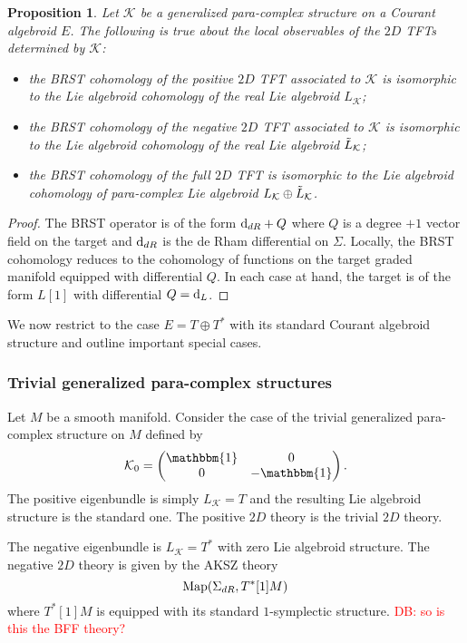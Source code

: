 \documentclass[letterpaper,12pt]{article}
\newcommand{\TT}{{T\oplus T^*}}
\newcommand{\KK}{\mathcal{K}}
\def\d{{\rm d}}
\newcommand{\id}{\mathbbm{1}}
\newtheorem{proposition}[theorem]{Proposition}
\theoremstyle{definition}
\theoremstyle{remark}
\theoremstyle{examples}
\def\david{\textcolor{red}{DB: }\textcolor{red}}
\begin{document}
\begin{proposition}
Let $\KK$ be a generalized para-complex structure on a Courant algebroid $E$.
The following is true about the local observables of the $2D$ TFTs determined by $\KK$:
\begin{itemize}
\item[(1)] the BRST cohomology of the positive $2D$ TFT associated to $\KK$ is isomorphic to the Lie algebroid cohomology of the real Lie algebroid $L_{\KK}$; 
\item[(2)] the BRST cohomology of the negative $2D$ TFT associated to $\KK$ is isomorphic to the Lie algebroid cohomology of the real Lie algebroid $\Tilde{L}_{\KK}$;
\item[(3)] the BRST cohomology of the full $2D$ TFT is isomorphic to the Lie algebroid cohomology of para-complex Lie algebroid $L_{\KK} \oplus \Tilde{L}_{\KK}$.
 \end{itemize}
\end{proposition}

\begin{proof}
The BRST operator is of the form $\d_{dR} + Q$ where $Q$ is a degree $+1$ vector field on the target and $\d_{dR}$ is the de Rham differential on $\Sigma$.  
Locally, the BRST cohomology reduces to the cohomology of functions on the target graded manifold equipped with differential $Q$.
In each case at hand, the target is of the form $L[1]$ with differential $Q = \d_L$.
\end{proof}

We now restrict to the case $E = \TT$ with its standard Courant algebroid structure and outline important special cases.

\subsubsection*{Trivial generalized para-complex structures}

Let $M$ be a smooth manifold.
Consider the case of the trivial generalized para-complex structure on $M$ defined by
\begin{align*}
\KK_0=
\begin{pmatrix}
\id & 0 \\
0 & -\id
\end{pmatrix}.
\end{align*}
The positive eigenbundle is simply $L_\KK = T$ and the resulting Lie algebroid structure is the standard one.
The positive $2D$ theory is the trivial $2D$ theory.  

The negative eigenbundle is $L_{\KK} = T^*$ with zero Lie algebroid structure.
The negative $2D$ theory is given by the AKSZ theory
\[
{\rm Map}(\Sigma_{dR} , T^*[1] M)
\]
where $T^*[1]M$ is equipped with its standard $1$-symplectic structure. \david{so is this the BFF theory?}
\end{document}
